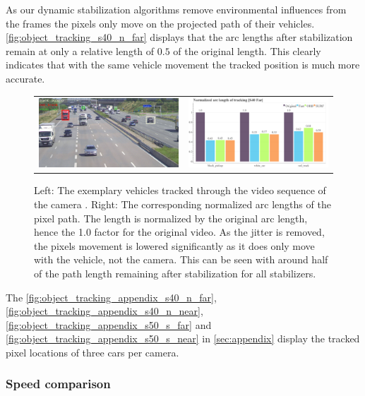 As our dynamic stabilization algorithms remove environmental influences from the frames the pixels only move on the projected path of their vehicles.
\autoref{fig:object_tracking_s40_n_far} displays that the arc lengths after stabilization remain at only a relative length of $0.5$ of the original length.
This clearly indicates that with the same vehicle movement the tracked position is much more accurate.

\begin{figure}[!ht]
    \centering
    \begin{tabular}{cc}
      \includegraphics[width=0.475\linewidth]{diagrams/object_tracking/s40_n_far/frame_cropped.png}    &  
      \includegraphics[width=0.475\linewidth]{diagrams/object_tracking/s40_n_far/arcs.png}    
\end{tabular}
    \caption{Left: 
    The exemplary vehicles tracked through the video sequence of the camera . 
    Right:
    The corresponding normalized arc lengths of the pixel path. 
    The length is normalized by the original arc length, hence the 1.0 factor for the original video. 
    As the jitter is removed, the pixels movement is lowered significantly as it does only move with the vehicle, not the camera.
    This can be seen with around half of the path length remaining after stabilization for all stabilizers.
    }
    \label{fig:object_tracking_s40_n_far}
\end{figure}

The 
\autoref{fig:object_tracking_appendix_s40_n_far}, 
\autoref{fig:object_tracking_appendix_s40_n_near}, 
\autoref{fig:object_tracking_appendix_s50_s_far} and 
\autoref{fig:object_tracking_appendix_s50_s_near} in \autoref{sec:appendix} display the tracked pixel locations of three cars per camera.

\subsubsection{Speed comparison}